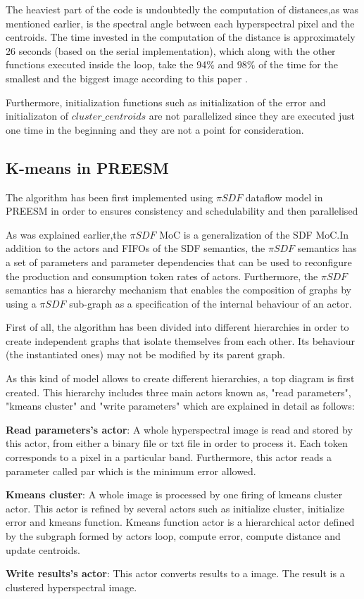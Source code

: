 	The heaviest part of the code is undoubtedly the computation of distances,as was mentioned earlier, is the spectral angle between each hyperspectral pixel and the centroids. The time invested in the computation of the distance is approximately 26 seconds (based on the serial implementation), which along with the other functions executed inside the loop, take the 94$\%$ and $98\%$ of the time for the smallest and the biggest image according to this paper \cite{torti2018paralle}.
	
	Furthermore, initialization functions such as initialization of the error and initializaton of $cluster\_centroids$ are not parallelized since they are executed just one time in the beginning and they are not a point for consideration. 
	
	
	 \subsection{K-means in PREESM}
	 
	 The algorithm has been first implemented using $\pi SDF$ dataflow model in PREESM in order to ensures consistency and schedulability and then parallelised
	 	 
	As was explained earlier,the  $\pi SDF$ MoC is a generalization of the SDF MoC.In addition to the actors and FIFOs of the SDF semantics, the  $\pi SDF$ semantics has a set of parameters and parameter dependencies that can be used to reconfigure the production and consumption token rates of actors. Furthermore, the  $\pi SDF$ semantics has a hierarchy mechanism that enables the composition of graphs by using a $\pi    SDF$ sub-graph as a specification of the internal behaviour of an actor.
	
	First of all, the algorithm has been divided into different hierarchies in order to create independent graphs that isolate themselves from each other. Its behaviour (the instantiated ones) may not be modified by its parent graph.
	
	As this kind of model allows to create different hierarchies, a top diagram is first created. This hierarchy includes three main actors known as, "read parameters", "kmeans cluster" and "write parameters" which are explained in detail as follows:
	
	\textbf{Read parameters's actor}: A whole hyperspectral image is read and stored by this actor, from either a binary file or txt file in order to process it. Each token corresponds to a pixel in a particular band.
	 Furthermore, this actor reads a parameter called par which is the minimum error allowed.
\par
	\setlength\parindent{24pt}\textbf{Kmeans cluster}: A whole image is processed by one firing of kmeans cluster actor. This actor is refined by several actors such as initialize cluster, initialize error and kmeans function. Kmeans function actor is a hierarchical actor defined by the subgraph  formed by actors loop, compute error, compute distance and update centroids. \par
	\setlength\parindent{24pt}\textbf{Write results's actor}: This actor converts results to a image. The result is a clustered hyperspectral image.
	
